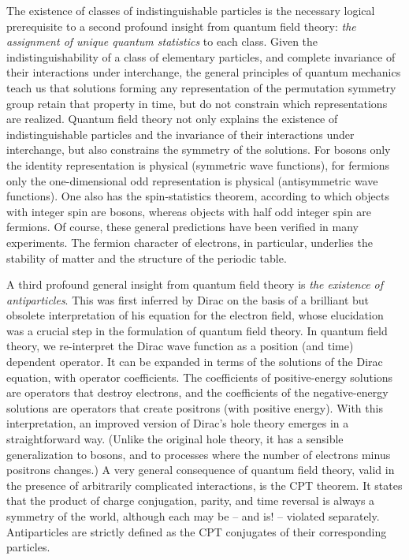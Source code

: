 \documentclass[aps,epsf]{revtex4}
\begin{document}
The existence of
classes of indistinguishable particles is the necessary logical
prerequisite to a second profound insight from quantum field theory:
{\it the assignment of unique quantum statistics\/} to each class.
Given the indistinguishability of a class of
elementary particles, and complete invariance of their interactions
under interchange, the general principles of quantum mechanics teach
us that solutions forming any representation of the permutation
symmetry group retain that property in time, but do not constrain
which representations are realized.  Quantum field theory not only
explains the existence of indistinguishable particles and the
invariance of their interactions under interchange, but also
constrains the symmetry of the solutions.  For bosons only the
identity representation is physical (symmetric wave functions), for
fermions only the one-dimensional odd representation is physical
(antisymmetric wave functions).  One also has the spin-statistics
theorem, according to which objects with integer spin are bosons,
whereas objects with half odd integer spin are fermions.  Of course,
these general predictions have been verified in many experiments.  The
fermion character of electrons, in particular, underlies the stability
of matter and the structure of the periodic table.  

A third profound
general insight from quantum field theory is {\it the existence of
antiparticles}.  This was first inferred by Dirac on the basis of a
brilliant but obsolete interpretation of his equation for the electron
field, whose elucidation was a crucial step in the formulation of
quantum field theory.   In quantum field theory, we re-interpret the Dirac wave
function as a position (and time) dependent operator.  It can be
expanded in terms of the solutions of the Dirac equation, with
operator coefficients.  The coefficients of positive-energy solutions
are operators that destroy electrons, and the coefficients of the
negative-energy solutions are operators that create positrons (with
positive energy).  With this interpretation, an improved version of
Dirac's hole theory 
emerges in a straightforward way. (Unlike the original hole theory,
it has
a sensible generalization to bosons, and to
processes where the number of electrons minus positrons changes.)
A very general consequence of
quantum field theory, valid in the presence of arbitrarily complicated
interactions, is the CPT theorem.  It states that the product of
charge conjugation, parity, and time reversal is always a symmetry of
the world, although each may be -- and is! -- violated separately.
Antiparticles are strictly defined as the CPT conjugates of their
corresponding particles.  
\end{document}
